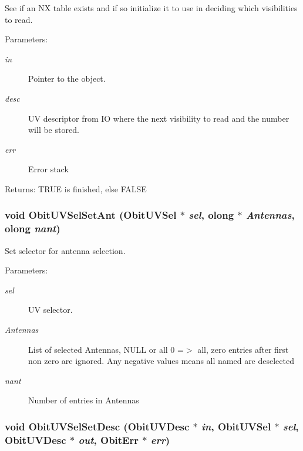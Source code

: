 See if an NX table exists and if so initialize it to use in deciding which visibilities to read. 

\begin{Desc}
\item[Parameters:]
\begin{description}
\item[{\em in}]Pointer to the object. \item[{\em desc}]UV descriptor from IO where the next visibility to read and the number will be stored. \item[{\em err}]Error stack \end{description}
\end{Desc}
\begin{Desc}
\item[Returns:]TRUE is finished, else FALSE \end{Desc}
\subsubsection{\setlength{\rightskip}{0pt plus 5cm}void Obit\-UVSel\-Set\-Ant ({\bf Obit\-UVSel} $\ast$ {\em sel}, {\bf olong} $\ast$ {\em Antennas}, {\bf olong} {\em nant})}\label{ObitUVSel_8c_a18}


Set selector for antenna selection. 

\begin{Desc}
\item[Parameters:]
\begin{description}
\item[{\em sel}]UV selector. \item[{\em Antennas}]List of selected Antennas, NULL or all 0 =$>$ all, zero entries after first non zero are ignored. Any negative values means all named are deselected \item[{\em nant}]Number of entries in Antennas \end{description}
\end{Desc}
\subsubsection{\setlength{\rightskip}{0pt plus 5cm}void Obit\-UVSel\-Set\-Desc ({\bf Obit\-UVDesc} $\ast$ {\em in}, {\bf Obit\-UVSel} $\ast$ {\em sel}, {\bf Obit\-UVDesc} $\ast$ {\em out}, {\bf Obit\-Err} $\ast$ {\em err})}\label{ObitUVSel_8c_a13}


